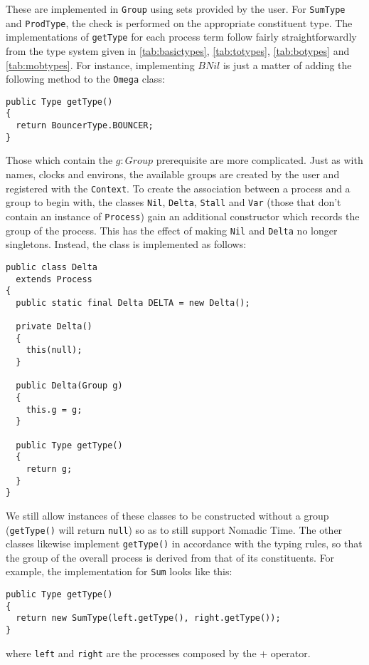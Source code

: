 These are implemented in \texttt{Group} using sets provided by the
user.  For \texttt{SumType} and \texttt{ProdType}, the check is
performed on the appropriate constituent type.  The implementations of
\texttt{getType} for each process term follow fairly straightforwardly
from the type system given in \ref{tab:basictypes}, \ref{tab:totypes},
\ref{tab:botypes} and \ref{tab:mobtypes}.  For instance, implementing
$BNil$ is just a matter of adding the following method to the
\texttt{Omega} class:

\begin{verbatim}
public Type getType()
{
  return BouncerType.BOUNCER;
}
\end{verbatim}

Those which contain the $g : Group$ prerequisite are more complicated.
Just as with names, clocks and environs, the available groups are
created by the user and registered with the \texttt{Context}.  To
create the association between a process and a group to begin with,
the classes \texttt{Nil}, \texttt{Delta}, \texttt{Stall} and
\texttt{Var} (those that don't contain an instance of
\texttt{Process}) gain an additional constructor which records the
group of the process.  This has the effect of making \texttt{Nil} and
\texttt{Delta} no longer singletons.  Instead, the class is
implemented as follows:

\begin{verbatim}
public class Delta
  extends Process
{
  public static final Delta DELTA = new Delta();

  private Delta() 
  { 
    this(null); 
  }
  
  public Delta(Group g) 
  { 
    this.g = g; 
  }

  public Type getType()
  {
    return g;
  }
}
\end{verbatim}

We still allow instances of these classes to be constructed without a
group (\texttt{getType()} will return \texttt{null}) so as to still
support Nomadic Time.  The other classes likewise implement
\texttt{getType()} in accordance with the typing rules, so that the
group of the overall process is derived from that of its constituents.
For example, the implementation for \texttt{Sum} looks like this:

\begin{verbatim}
public Type getType()
{
  return new SumType(left.getType(), right.getType());
}
\end{verbatim}

\noindent where \texttt{left} and \texttt{right} are the processes
composed by the $+$ operator.

